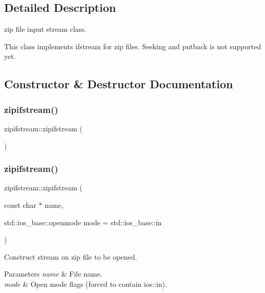 \subsection{Detailed Description}
zip file input stream class. 

This class implements ifstream for zip files. Seeking and putback is not supported yet. 

\subsection{Constructor \& Destructor Documentation}
\mbox{\label{classzipifstream_a6c70a47a8d5c13f3f5c61299a1136fa8}} 
\subsubsection{\texorpdfstring{zipifstream()}{zipifstream()}\hspace{0.1cm}{\footnotesize\ttfamily [1/2]}}
{\footnotesize\ttfamily zipifstream\+::zipifstream (\begin{DoxyParamCaption}{ }\end{DoxyParamCaption})}

\mbox{\label{classzipifstream_ab034c1ab8a0187f37f5e92a25273f497}} 
\subsubsection{\texorpdfstring{zipifstream()}{zipifstream()}\hspace{0.1cm}{\footnotesize\ttfamily [2/2]}}
{\footnotesize\ttfamily zipifstream\+::zipifstream (\begin{DoxyParamCaption}\item[{const char $\ast$}]{name,  }\item[{std\+::ios\+\_\+base\+::openmode}]{mode = {\ttfamily std\+:\+:ios\+\_\+base\+:\+:in} }\end{DoxyParamCaption})\hspace{0.3cm}{\ttfamily [explicit]}}



Construct stream on zip file to be opened. 


\begin{DoxyParams}{Parameters}
{\em name} & File name. \\
\hline
{\em mode} & Open mode flags (forced to contain ios\+::in). \\
\hline
\end{DoxyParams}


